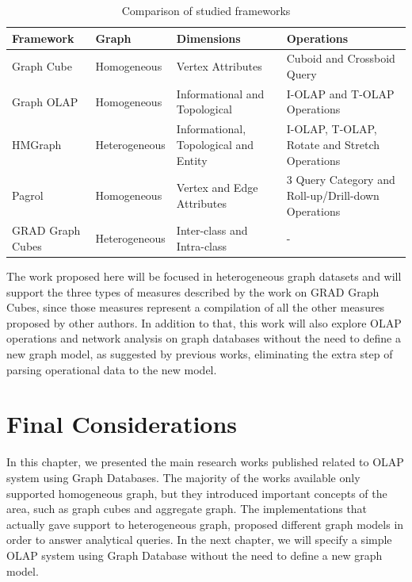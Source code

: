 \begin{table}[!ht]
\setlength\extrarowheight{2pt}
\caption{Comparison of studied frameworks}
\label{tb:table1}
\begin{tabularx}{\textwidth}{|Y|Z|Z|Z|}
\hline
{}\textbf{Framework} & \textbf{Graph} & \textbf{Dimensions} & \textbf{Operations}\\\hline
{ Graph Cube} & Homogeneous & Vertex Attributes & Cuboid and Crossboid Query\\\hline
{ Graph OLAP} & Homogeneous & Informational and Topological & I-OLAP and T-OLAP Operations\\\hline
{ HMGraph} & Heterogeneous & Informational, Topological and Entity & I-OLAP, T-OLAP, Rotate and Stretch Operations\\\hline
{ Pagrol} & Homogeneous & Vertex and Edge Attributes & 3 Query Category and Roll-up/Drill-down Operations \\ \hline
{ GRAD Graph Cubes} & Heterogeneous & Inter-class and Intra-class & - \\ \hline
\end{tabularx}
\end{table}

The work proposed here will be focused in heterogeneous graph datasets and will support the three types of measures described by the work on GRAD Graph Cubes, since those measures represent a compilation of all the other measures proposed by other authors. In addition to that, this work will also explore OLAP operations and network analysis on graph databases without the need to define a new graph model, as suggested by previous works, eliminating the extra step of parsing operational data to the new model.

\section{Final Considerations}

In this chapter, we presented the main research works published related to OLAP system using Graph Databases. The majority of the works available only supported homogeneous graph, but they introduced important concepts of the area, such as graph cubes and aggregate graph. The implementations that actually gave support to heterogeneous graph, proposed different graph models in order to answer analytical queries. In the next chapter, we will specify a simple OLAP system using Graph Database without the need to define a new graph model.
